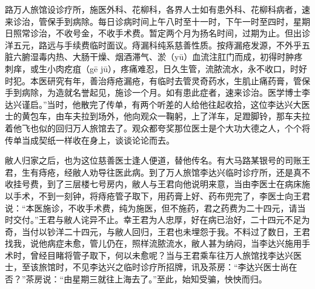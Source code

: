 \documentclass[12pt,UTF8]{ctexbook}
\begin{document}
路万人旅馆设诊疗所，施医外科、花柳科，各界人士如有患外科、花柳科病者，速来诊治，管保手到病除。每日诊病时间上午八时至十一时，下午一时至四时，星期日照常诊治，不收号金，不收手术费。暂定两个月为扬名时间，过期为止。但出诊洋五元，路远与手续费临时面议。痔漏科纯系慈善性质。按痔漏疮发源，不外乎五脏六腑湿毒内热、大肠干燥、烟酒滞气、淤（yū）血流注肛门而成，初得时肿疼刺痒，或生小肉疙疽（gē jū），疼痛难忍，日久生管，流脓流水，永不收口，时好时犯。本医研究有年，善治痔疮漏疮，有临时去管灵奇药水，生肌止痛药膏，管保手到病除，为造就名誉起见，施诊一个月。如有患此症者，速来诊治。医学博士李达兴谨启。”当时，他散完了传单，有两个听差的人给他往起收拾，这位李达兴大医士的黄包车，由车夫拉到场外，他向观众一鞠躬，上了洋车，足蹬脚铃，那车夫拉着他飞也似的回归万人旅馆去了。观众都夸奖那位医士是个大功大德之人，个个将传单当成契纸一样收在身上，谈谈论论而去。

敝人归家之后，也为这位慈善医士逢人便道，替他传名。有大马路某银号的司账王君，生有痔疮，经敝人劝导往医此病。到了万人旅馆李达兴临时诊疗所，还是真不收挂号费，到了三层楼七号房内，敝人与王君向他说明来意，当由李医士在病床施以手术，不到一刻钟，将痔疮管子取下，用药膏上好、药布兜完了，李医士向王君说：“本医施诊，不收手术费，纯为施医，但不施药，君之药费为二十四元，请当时交付。”王君与敝人诧异不止。幸王君为人忠厚，好在病已治好，二十四元不足为奇，当付以钞洋二十四元，与敝人回归，王君也未埋怨于我。不料过了数日，王君找我，说他病症未愈，管儿仍在，照样流脓流水，敝人甚为纳闷，当李达兴施用手术时，曾经目睹将管子取下，何以未愈呢？当与王君乘车往万人旅馆找李达兴医士，至该旅馆时，不见李达兴之临时诊疗所招牌，讯及茶房：“李达兴医士尚在否？”茶房说：“由星期三就往上海去了。”至此，始知受骗，怏怏而归。
\end{document}
